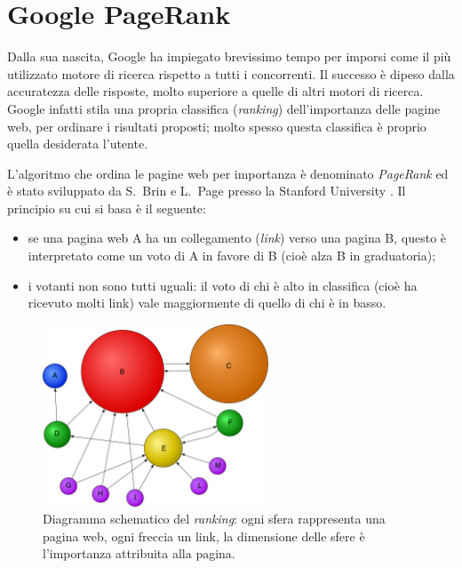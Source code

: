 \section*{Google PageRank}

Dalla sua nascita, Google ha impiegato brevissimo tempo per imporsi
come il pi\`u utilizzato motore di ricerca rispetto a tutti i
concorrenti. Il successo \`e dipeso dalla accuratezza delle risposte,
molto superiore a quelle di altri motori di ricerca.
Google infatti stila una propria classifica (\emph{ranking})
dell'importanza delle pagine web, per ordinare i risultati proposti;
molto spesso questa classifica \`e proprio quella desiderata l'utente.

L'algoritmo che ordina le pagine web per importanza \`e denominato
\emph{PageRank} ed \`e stato sviluppato da S.~Brin e L.~Page presso
la Stanford University \cite{Brin1998}.
Il principio su cui si basa \`e il seguente:
\begin{itemize}

    \item se una pagina web A ha un collegamento (\emph{link}) verso una
        pagina B, questo \`e interpretato come un voto di A in favore di B
        (cio\`e alza B in graduatoria);

    \item i votanti non sono tutti uguali: il voto di chi \`e alto in
        classifica (cio\`e ha ricevuto molti link) vale maggiormente di quello di chi \`e
        in basso.

\end{itemize}

\begin{figure}[htbp]
    \centering
    \includegraphics[width=0.6\textwidth]{./fig/PageRanks_Example_only_letters}
    \caption{Diagramma schematico del \emph{ranking}: ogni sfera rappresenta una pagina
            web, ogni freccia un link, la dimensione delle sfere \`e l'importanza
            attribuita alla pagina.}\label{fig:PR}
\end{figure}


